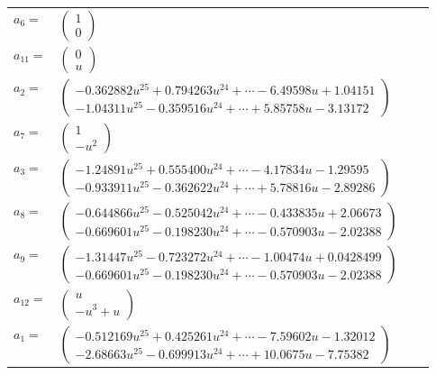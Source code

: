 \documentclass[1p]{elsarticle_modified}
\theoremstyle{definition}
\begin{document}
\begin{tabular}{m{7pt} m{180pt} m{7pt} m{180pt} }
\flushright $a_{6}=$&$\begin{pmatrix}1\\0\end{pmatrix}$ \\
\flushright $a_{11}=$&$\begin{pmatrix}0\\u\end{pmatrix}$ \\
\flushright $a_{2}=$&$\begin{pmatrix}-0.362882 u^{25}+0.794263 u^{24}+\cdots-6.49598 u+1.04151\\-1.04311 u^{25}-0.359516 u^{24}+\cdots+5.85758 u-3.13172\end{pmatrix}$ \\
\flushright $a_{7}=$&$\begin{pmatrix}1\\- u^2\end{pmatrix}$ \\
\flushright $a_{3}=$&$\begin{pmatrix}-1.24891 u^{25}+0.555400 u^{24}+\cdots-4.17834 u-1.29595\\-0.933911 u^{25}-0.362622 u^{24}+\cdots+5.78816 u-2.89286\end{pmatrix}$ \\
\flushright $a_{8}=$&$\begin{pmatrix}-0.644866 u^{25}-0.525042 u^{24}+\cdots-0.433835 u+2.06673\\-0.669601 u^{25}-0.198230 u^{24}+\cdots-0.570903 u-2.02388\end{pmatrix}$ \\
\flushright $a_{9}=$&$\begin{pmatrix}-1.31447 u^{25}-0.723272 u^{24}+\cdots-1.00474 u+0.0428499\\-0.669601 u^{25}-0.198230 u^{24}+\cdots-0.570903 u-2.02388\end{pmatrix}$ \\
\flushright $a_{12}=$&$\begin{pmatrix}u\\- u^3+u\end{pmatrix}$ \\
\flushright $a_{1}=$&$\begin{pmatrix}-0.512169 u^{25}+0.425261 u^{24}+\cdots-7.59602 u-1.32012\\-2.68663 u^{25}-0.699913 u^{24}+\cdots+10.0675 u-7.75382\end{pmatrix}$ \\

\end{tabular}
\end{document}

